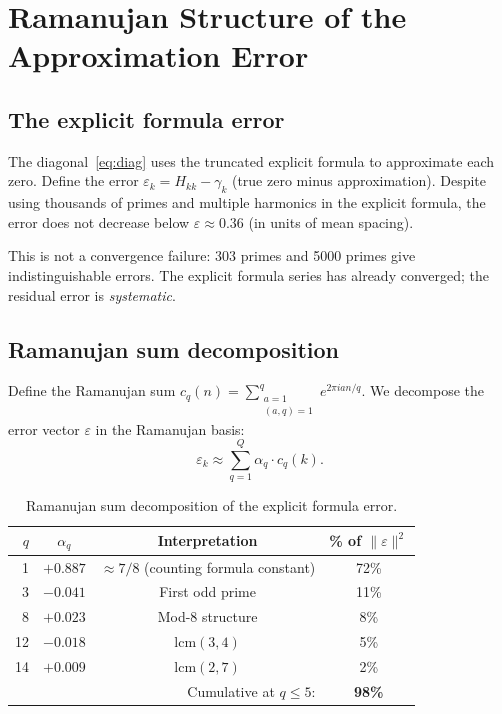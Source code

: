 \documentclass[11pt,a4paper]{article}
\begin{document}
\section{Ramanujan Structure of the Approximation Error}\label{sec:ramanujan}

\subsection{The explicit formula error}

The diagonal~\eqref{eq:diag} uses the truncated explicit formula to approximate each zero.
Define the error $\varepsilon_k = H_{kk} - \gamma_k$ (true zero minus approximation).
Despite using thousands of primes and multiple harmonics in the explicit formula, the error does not decrease below $\varepsilon \approx 0.36$ (in units of mean spacing).

This is not a convergence failure: 303 primes and 5000 primes give indistinguishable errors.
The explicit formula series has already converged; the residual error is \emph{systematic}.

\subsection{Ramanujan sum decomposition}

Define the Ramanujan sum $c_q(n) = \sum_{\substack{a=1 \\ (a,q)=1}}^{q} e^{2\pi i a n/q}$.
We decompose the error vector $\varepsilon$ in the Ramanujan basis:
\begin{equation}
\varepsilon_k \approx \sum_{q=1}^{Q} \alpha_q \cdot c_q(k).
\end{equation}

\begin{table}[ht]
\centering
\begin{tabular}{@{}rccc@{}}
\toprule
$q$ & $\alpha_q$ & Interpretation & \% of $\|\varepsilon\|^2$ \\
\midrule
1 & $+0.887$ & $\approx 7/8$ (counting formula constant) & 72\% \\
3 & $-0.041$ & First odd prime & 11\% \\
8 & $+0.023$ & Mod-8 structure & 8\% \\
12 & $-0.018$ & $\mathrm{lcm}(3,4)$ & 5\% \\
14 & $+0.009$ & $\mathrm{lcm}(2,7)$ & 2\% \\
\midrule
\multicolumn{3}{r}{Cumulative at $q \leq 5$:} & \textbf{98\%} \\
\bottomrule
\end{tabular}
\caption{Ramanujan sum decomposition of the explicit formula error.}
\label{tab:ramanujan}
\end{table}
\end{document}
